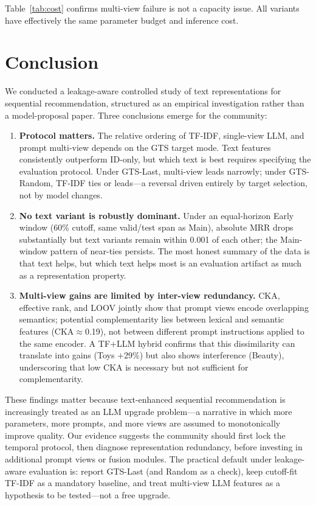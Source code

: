 \documentclass[sigconf,natbib=true,anonymous]{acmart}
\newcommand{\tfidf}{\textsc{TF-IDF}\xspace}
\newcommand{\llm}{\textsc{LLM}\xspace}
\begin{document}
Table~\ref{tab:cost} confirms multi-view failure is not a capacity issue.  All variants have effectively the same parameter budget and inference cost.

\section{Conclusion}
\label{sec:conclusion}

We conducted a leakage-aware controlled study of text representations for sequential recommendation, structured as an empirical investigation rather than a model-proposal paper.
Three conclusions emerge for the community:

\begin{enumerate}[leftmargin=*,itemsep=1pt]
\item \textbf{Protocol matters.}
The relative ordering of \tfidf, single-view \llm, and prompt multi-view depends on the GTS target mode.
Text features consistently outperform ID-only, but which text is best requires specifying the evaluation protocol.
Under GTS-Last, multi-view leads narrowly; under GTS-Random, \tfidf ties or leads---a reversal driven entirely by target selection, not by model changes.
\item \textbf{No text variant is robustly dominant.}
Under an equal-horizon Early window ($60\%$ cutoff, same valid/test span as Main), absolute MRR drops substantially but text variants remain within 0.001 of each other; the Main-window pattern of near-ties persists.
The most honest summary of the data is that text helps, but which text helps most is an evaluation artifact as much as a representation property.
\item \textbf{Multi-view gains are limited by inter-view redundancy.}
CKA, effective rank, and LOOV jointly show that prompt views encode overlapping semantics; potential complementarity lies between lexical and semantic features (CKA$\approx$0.19), not between different prompt instructions applied to the same encoder.
A TF+LLM hybrid confirms that this dissimilarity can translate into gains (Toys $+$29\%) but also shows interference (Beauty), underscoring that low CKA is necessary but not sufficient for complementarity.
\end{enumerate}

These findings matter because text-enhanced sequential recommendation is increasingly treated as an LLM upgrade problem---a narrative in which more parameters, more prompts, and more views are assumed to monotonically improve quality.
Our evidence suggests the community should first lock the temporal protocol, then diagnose representation redundancy, before investing in additional prompt views or fusion modules.
The practical default under leakage-aware evaluation is: report GTS-Last (and Random as a check), keep cutoff-fit \tfidf as a mandatory baseline, and treat multi-view LLM features as a hypothesis to be tested---not a free upgrade.
\end{document}
